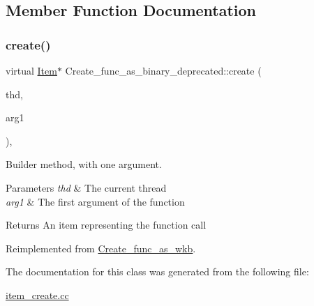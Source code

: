\subsection{Member Function Documentation}
\mbox{\label{classCreate__func__as__binary__deprecated_a26266523ce60462f787514813b40e9af}} 
\subsubsection{\texorpdfstring{create()}{create()}}
{\footnotesize\ttfamily virtual \mbox{\hyperlink{classItem}{Item}}$\ast$ Create\+\_\+func\+\_\+as\+\_\+binary\+\_\+deprecated\+::create (\begin{DoxyParamCaption}\item[{T\+HD $\ast$}]{thd,  }\item[{\mbox{\hyperlink{classItem}{Item}} $\ast$}]{arg1 }\end{DoxyParamCaption})\hspace{0.3cm}{\ttfamily [inline]}, {\ttfamily [virtual]}}

Builder method, with one argument. 
\begin{DoxyParams}{Parameters}
{\em thd} & The current thread \\
\hline
{\em arg1} & The first argument of the function \\
\hline
\end{DoxyParams}
\begin{DoxyReturn}{Returns}
An item representing the function call 
\end{DoxyReturn}


Reimplemented from \mbox{\hyperlink{classCreate__func__as__wkb_a23a8a1800ba7753c66e680e35451d8a4}{Create\+\_\+func\+\_\+as\+\_\+wkb}}.



The documentation for this class was generated from the following file\+:\begin{DoxyCompactItemize}
\item 
\mbox{\hyperlink{item__create_8cc}{item\+\_\+create.\+cc}}\end{DoxyCompactItemize}
